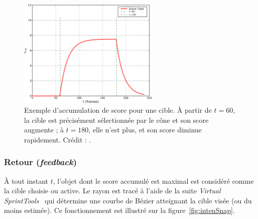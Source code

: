 	\begin{figure}[!htb]
		\centering
		\includegraphics[width=0.60\textwidth]{figures/ch2/intensAccumul}
		\caption[\emph{IntenSelect} -- accumulation de score]{Exemple d'accumulation de score pour une cible. À partir de $t = 60$, la cible est précisément sélectionnée par le cône et son score augmente ; à $t = 180$, elle n'est plus, et son score diminue rapidement. Crédit : \cite{de2005intenselect}.}
		\label{fig:intensAccumul}
	\end{figure}
	
	\subsubsection{Retour (\emph{feedback})}
	À tout instant $t$, l'objet dont le score accumulé est maximal est considéré comme la cible choisie ou active. Le rayon est tracé à l'aide de la suite \emph{Virtual SprintTools}~\cite{koutek2001spring} qui détermine une courbe de Bézier atteignant la cible visée (ou du moins estimée). Ce fonctionnement est illustré sur la figure~\ref{fig:intenSnap}.

